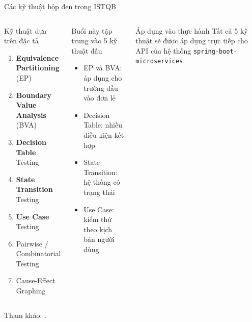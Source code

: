 \documentclass[aspectratio=169,12pt]{beamer}
\begin{document}
\begin{frame}[shrink=12]{Các kỹ thuật hộp đen trong ISTQB}
  \begin{columns}
    \begin{block}{Kỹ thuật dựa trên đặc tả}
      \begin{enumerate}
        \item \textbf{Equivalence Partitioning} (EP)
        \item \textbf{Boundary Value Analysis} (BVA)
        \item \textbf{Decision Table} Testing
        \item \textbf{State Transition} Testing
        \item \textbf{Use Case} Testing
        \item Pairwise / Combinatorial Testing
        \item Cause-Effect Graphing
      \end{enumerate}
    \end{block}

    \begin{block}{Buổi này tập trung vào 5 kỹ thuật đầu}
      \begin{itemize}
        \item EP và BVA: áp dụng cho trường đầu vào đơn lẻ
        \item Decision Table: nhiều điều kiện kết hợp
        \item State Transition: hệ thống có trạng thái
        \item Use Case: kiểm thử theo kịch bản người dùng
      \end{itemize}
    \end{block}

    \vspace{0.3em}
    \begin{exampleblock}{Áp dụng vào thực hành}
      Tất cả 5 kỹ thuật sẽ được áp dụng trực tiếp cho
      API của hệ thống \texttt{spring-boot-microservices}.
    \end{exampleblock}
  \end{columns}

  \vspace{-0.3em}
  {\scriptsize Tham khảo: \cite{istqb-ctfl}.}
\end{frame}

\end{document}
